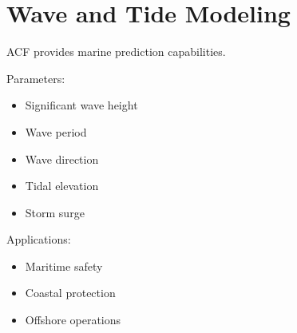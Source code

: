 \section{Wave and Tide Modeling}


ACF provides marine prediction capabilities.



Parameters:


\begin{itemize}

\item Significant wave height

\item Wave period

\item Wave direction

\item Tidal elevation

\item Storm surge

\end{itemize}



Applications:


\begin{itemize}

\item Maritime safety

\item Coastal protection

\item Offshore operations

\end{itemize}
